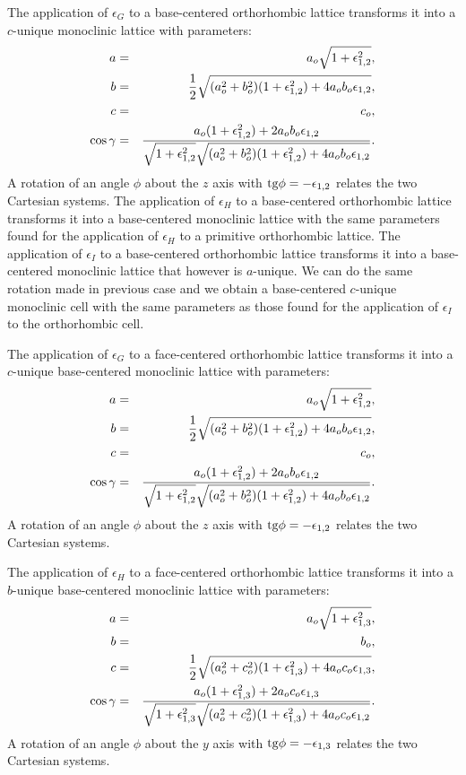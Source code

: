 \documentclass[12pt,a4paper]{article}
\begin{document}
The application of $\epsilon_G$ to a base-centered orthorhombic lattice
transforms it into a $c$-unique monoclinic lattice with parameters:
\begin{eqnarray}
a&=&a_o \sqrt{1+\epsilon_{1,2}^2}, \\
b&=&{1\over 2} \sqrt{(a_o^2+b_o^2)(1+\epsilon_{1,2}^2)+4a_ob_o\epsilon_{1,2}}, \\
c&=&c_o,  \\
\cos\gamma &=& {a_o (1+\epsilon_{1,2}^2)+2a_ob_o\epsilon_{1,2} \over
\sqrt{1+\epsilon_{1,2}^2} \sqrt{(a_o^2+b_o^2)
(1+\epsilon_{1,2}^2)+4a_ob_o\epsilon_{1,2}}}. 
\end{eqnarray}
A rotation of an angle $\phi$ about the $z$ axis with 
${\rm tg}\phi=-\epsilon_{1,2}$ relates the two Cartesian systems.
The application of $\epsilon_H$ to a base-centered orthorhombic lattice
transforms it into a base-centered monoclinic lattice with the same parameters
found for the application of $\epsilon_H$ to a primitive orthorhombic lattice.
The application of $\epsilon_I$ to a base-centered orthorhombic lattice
transforms it into a base-centered monoclinic lattice that however
is $a$-unique. We can do the same rotation made in previous case
and we obtain a base-centered $c$-unique monoclinic cell with 
the same parameters as those found for the application of $\epsilon_I$ 
to the orthorhombic cell.

The application of $\epsilon_G$ to a face-centered orthorhombic lattice
transforms it into a $c$-unique base-centered monoclinic lattice with 
parameters:
\begin{eqnarray}
a&=&a_o \sqrt{1+\epsilon_{1,2}^2}, \\
b&=&{1\over 2} \sqrt{(a_o^2+b_o^2)(1+\epsilon_{1,2}^2)+4a_ob_o\epsilon_{1,2}}, \\
c&=&c_o,  \\
\cos\gamma &=& {a_o (1+\epsilon_{1,2}^2)+2a_ob_o\epsilon_{1,2} \over
\sqrt{1+\epsilon_{1,2}^2} \sqrt{(a_o^2+b_o^2)
(1+\epsilon_{1,2}^2)+4a_ob_o\epsilon_{1,2}}}. 
\end{eqnarray}
A rotation of an angle $\phi$ about the $z$ axis with 
${\rm tg}\phi=-\epsilon_{1,2}$ relates the two Cartesian systems.

The application of $\epsilon_H$ to a face-centered orthorhombic lattice
transforms it into a $b$-unique base-centered monoclinic lattice with
parameters:
\begin{eqnarray}
a&=&a_o \sqrt{1+\epsilon_{1,3}^2}, \\
b&=&b_o,  \\
c&=&{1\over 2} \sqrt{(a_o^2+c_o^2)(1+\epsilon_{1,3}^2)+4a_oc_o\epsilon_{1,3}}, \\
\cos\gamma &=& {a_o (1+\epsilon_{1,3}^2)+2a_oc_o\epsilon_{1,3} \over
\sqrt{1+\epsilon_{1,3}^2} \sqrt{(a_o^2+c_o^2)
(1+\epsilon_{1,3}^2)+4a_oc_o\epsilon_{1,2}}}. 
\end{eqnarray}
A rotation of an angle $\phi$ about the $y$ axis with 
${\rm tg}\phi=-\epsilon_{1,3}$ relates the two Cartesian systems.
\end{document}
